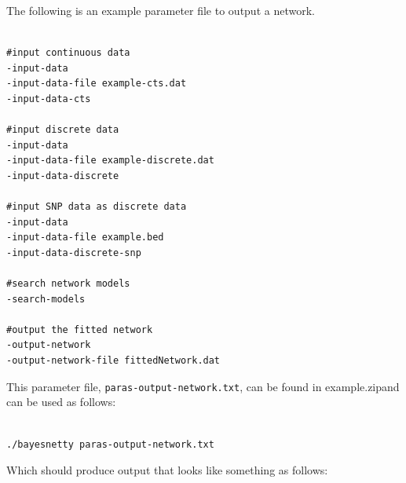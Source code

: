 \documentclass[a4paper,12pt]{article}
\newcommand{\code}[1]{{\footnotesize{{\tt #1}}}}
\begin{document}
The following is an example parameter file to output a network. 
\vspace{0.35cm} \begin{lstlisting}

#input continuous data
-input-data
-input-data-file example-cts.dat
-input-data-cts

#input discrete data
-input-data
-input-data-file example-discrete.dat
-input-data-discrete

#input SNP data as discrete data
-input-data
-input-data-file example.bed
-input-data-discrete-snp

#search network models
-search-models

#output the fitted network
-output-network
-output-network-file fittedNetwork.dat

\end{lstlisting} \vspace{0.35cm}
This parameter file, \code{paras-output-network.txt}, can be found in example.zipand can be used as follows: 
\vspace{0.35cm} \begin{lstlisting}

./bayesnetty paras-output-network.txt

\end{lstlisting} \vspace{0.35cm}
Which should produce output that looks like something as follows: 
\end{document}
